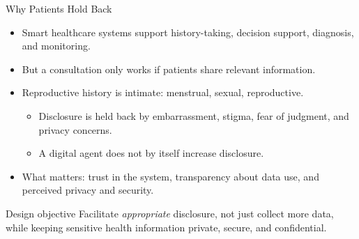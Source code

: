 \documentclass[
aspectratio=169,	%
english,			%
]{DEEclassP}
\begin{document}
\begin{frame}{Why Patients Hold Back}

\setlstep{0.2cm}{0.05cm}{0cm}
\begin{itemize}
	\item Smart healthcare systems support history-taking, decision support, diagnosis, and monitoring.
	\item But a consultation only works if patients \alert{share} relevant information.
	\item Reproductive history is intimate: menstrual, sexual, reproductive.
	\begin{itemize}
		\item Disclosure is held back by embarrassment, stigma, fear of judgment, and privacy concerns.
		\item A digital agent does \alert{not} by itself increase disclosure.
	\end{itemize}
	\item What matters: \alert{trust} in the system, \alert{transparency} about data use, and perceived \alert{privacy and security}.
\end{itemize}

\vspace{0.1cm}
\begin{block}{Design objective}
\small
Facilitate \emph{appropriate} disclosure, not just collect more data, while keeping sensitive health information private, secure, and confidential.
\end{block}

\end{frame}
\end{document}
